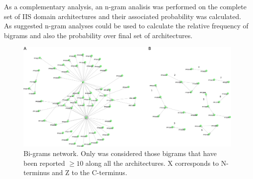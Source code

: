 \documentclass[11pt]{article}
\begin{document}
As a complementary analysis, an n-gram analisis was performed on the complete set of 
IIS domain architectures and their associated probability was calculated. 
As suggested \cite{Yu:2019} n-gram analyses could be used to calculate the 
relative frequency of bigrams and also the probability over final set of architectures.

\begin{figure}[ht!]
  \centering
  \includegraphics[scale=0.2]{figures/bigramsFinal}
  \caption{Bi-grams network. Only was considered those bigrams that
  have been reported $\geq 10$ along all the architectures.
  X corresponds to N-terminus and Z to the C-terminus.}\label{fig:bigramNet}
\end{figure}
\end{document}
